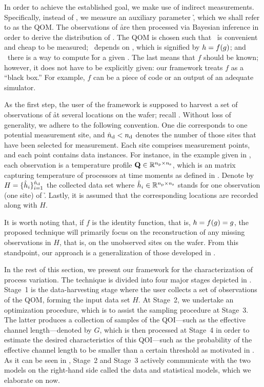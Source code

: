 In order to achieve the established goal, we make use of indirect measurements.
Specifically, instead of \g, we measure an auxiliary parameter \h, which we
shall refer to as the \ac{QOM}. The observations of \h are then processed via
Bayesian inference \cite{gelman2004} in order to derive the distribution of \g.
The \ac{QOM} is chosen such that \one~\h is convenient and cheap to be measured;
\two~\h depends on \g, which is signified by $h = f(g)$; and \three~there is a
way to compute \h for a given \g. The last means that $f$ should be known;
however, it does not have to be explicitly given: our framework treats $f$ as a
``black box.'' For example, $f$ can be a piece of code or an output of an
adequate simulator.

As the first step, the user of the framework is supposed to harvest a set of
observations of \h at several locations on the wafer; recall
. Without loss of generality, we adhere to the following
convention. One die corresponds to one potential measurement site, and ${\hat{n}_\mathrm{d}} <
{n_\mathrm{d}}$ denotes the number of those sites that have been selected for measurement.
Each site comprises \np measurement points, and each point contains \ns data
instances. For instance, in the example given in , each
observation is a temperature profile $\mathbf{Q} \in \mathbb{R}^{{n_\mathrm{p}} \times {n_\mathrm{s}}}$, which is
an matrix capturing temperature of \np processors at \ns time moments as defined
in . Denote by $H = \{ \hat{h}_i \}_{i = 1}^{{\hat{n}_\mathrm{d}}}$ the
collected data set where $\hat{h}_i \in \mathbb{R}^{{n_\mathrm{p}} \times {n_\mathrm{s}}}$ stands for one
observation (one site) of \h. Lastly, it is assumed that the corresponding
locations are recorded along with $H$.

It is worth noting that, if $f$ is the identity function, that is, $h = f(g) =
g$, the proposed technique will primarily focus on the reconstruction of any
missing observations in $H$, that is, on the unobserved sites on the wafer. From
this standpoint, our approach is a generalization of those developed in
\cite{zhang2010, reda2009}.

In the rest of this section, we present our framework for the characterization
of process variation. The technique is divided into four major stages depicted
in . Stage~1 is the data-harvesting stage where the
user collects a set of observations of the \ac{QOM}, forming the input data set
$H$. At Stage~2, we undertake an optimization procedure, which is to assist the
sampling procedure at Stage~3. The latter produces a collection of samples of
the \ac{QOI}---such as the effective channel length---denoted by $G$, which is
then processed at Stage~4 in order to estimate the desired characteristics of
this \ac{QOI}---such as the probability of the effective channel length to be
smaller than a certain threshold as motivated in . As it
can be seen in , Stage~2 and Stage~3 actively
communicate with the two models on the right-hand side called the data and
statistical models, which we elaborate on now.

